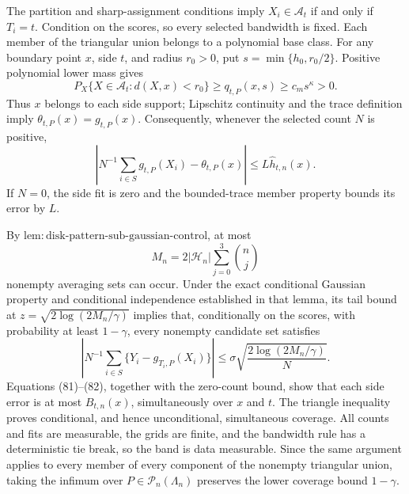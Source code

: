 The partition and sharp-assignment conditions imply \(X_i\in\mathcal A_t\) if and only if \(T_i=t\). Condition on the scores, so every selected bandwidth is fixed. Each member of the triangular union belongs to a polynomial base class. For any boundary point \(x\), side \(t\), and radius \(r_0>0\), put \(s=\min\{h_0,r_0/2\}\). Positive polynomial lower mass gives
\[
 P_X\{X\in\mathcal A_t:d(X,x)<r_0\}\ge q_{t,P}(x,s)\ge c_ms^\kappa>0.
\]
Thus \(x\) belongs to each side support; Lipschitz continuity and the trace definition imply \(\theta_{t,P}(x)=g_{t,P}(x)\). Consequently, whenever the selected count \(N\) is positive,
\[
 \left|N^{-1}\sum_{i\in S}g_{t,P}(X_i)-\theta_{t,P}(x)\right|
 \le L\widehat h_{t,n}(x). \tag{81}
\]
If \(N=0\), the side fit is zero and the bounded-trace member property bounds its error by \(L\).

By \(\mathrm{lem:disk\text{-}pattern\text{-}sub\text{-}gaussian\text{-}control}\), at most
\[
 M_n=2|\mathcal H_n|\sum_{j=0}^3\binom nj
\]
nonempty averaging sets can occur. Under the exact conditional Gaussian property and conditional independence established in that lemma, its tail bound at \(z=\sqrt{2\log(2M_n/\gamma)}\) implies that, conditionally on the scores, with probability at least \(1-\gamma\), every nonempty candidate set satisfies
\[
 \left|N^{-1}\sum_{i\in S}\{Y_i-g_{T_i,P}(X_i)\}\right|
 \le\sigma\sqrt{\frac{2\log(2M_n/\gamma)}N}. \tag{82}
\]
Equations (81)--(82), together with the zero-count bound, show that each side error is at most \(B_{t,n}(x)\), simultaneously over \(x\) and \(t\). The triangle inequality proves conditional, and hence unconditional, simultaneous coverage. All counts and fits are measurable, the grids are finite, and the bandwidth rule has a deterministic tie break, so the band is data measurable. Since the same argument applies to every member of every component of the nonempty triangular union, taking the infimum over \(P\in\mathcal P_n(\Lambda_n)\) preserves the lower coverage bound \(1-\gamma\).

